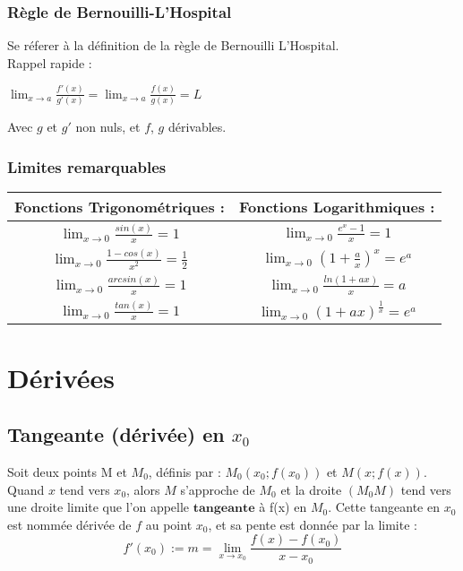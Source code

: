 \documentclass[12pt, a4paper]{book}
\begin{document}
\subsubsection{Règle de Bernouilli-L'Hospital}
Se réferer à la définition de la règle de Bernouilli L'Hospital.\\
Rappel rapide :\\
\begin{center}
    $\lim_{x \to a} \frac{f'(x)}{g'(x)} = \lim_{x \to a} \frac{f(x)}{g(x)}  = L$
\end{center}
\textit{}{Avec $g$ et $g'$ non nuls, et $f$, $g$ dérivables.}
\subsubsection{Limites remarquables}
\begin{tabular}{ |c | c| } 
    \hline
Fonctions Trigonométriques :&Fonctions Logarithmiques :\\
\hline
    $\lim_{x \to 0} \frac{sin(x)}{x} = 1$& $\lim_{x \to 0} \frac{e^x-1}{x} = 1$\\
    $\lim_{x \to 0} \frac{1-cos(x)}{x^2} = \frac{1}{2}$&$\lim_{x \to 0} (1 + \frac{a}{x})^x = e^a$\\
    $\lim_{x \to 0} \frac{arcsin(x)}{x} = 1$&$\lim_{x \to 0} \frac{ln(1+ax)}{x} = a$\\
    $\lim_{x \to 0} \frac{tan(x)}{x} = 1$&$\lim_{x \to 0} (1+ax)^\frac{1}{x} = e^a$\\
\hline
\end{tabular}


\newpage
\section{Dérivées}
        \subsection{Tangeante (dérivée) en $x_0$}
            Soit deux points M et $M_0$, définis par : $M_0(x_0;f(x_0))$ et $M(x;f(x))$.\\
            Quand $x$ tend vers $x_0$, alors $M$ s'approche de $M_0$ et la droite $(M_0M)$
            tend vers une droite limite que l'on appelle $\mathbf{tangeante}$ à f(x) en $M_0$.
            Cette tangeante en $x_0$ est nommée dérivée de $f$ au point $x_0$, et sa pente est donnée par la limite :\\
            $$
            \boxed{
            f'(x_0) := m = \lim_{x \to x_0} \frac{f(x)-f(x_0)}{x-x_0}
            }
            $$
\end{document}
